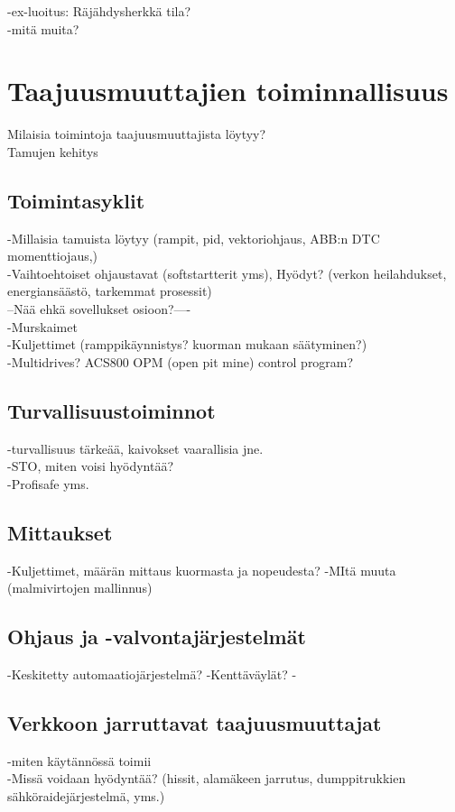\documentclass[finnish,12pt,a4paper,pdftex,elec,utf8]{aaltothesis}
\begin{document}
-ex-luoitus: Räjähdysherkkä tila?\\
-mitä muita?




\clearpage
\section{Taajuusmuuttajien toiminnallisuus}
Milaisia toimintoja taajuusmuuttajista löytyy?\\
Tamujen kehitys

\subsection{Toimintasyklit}
-Millaisia tamuista löytyy (rampit, pid, vektoriohjaus, ABB:n DTC momenttiojaus,)\\
-Vaihtoehtoiset ohjaustavat (softstartterit yms), Hyödyt? (verkon heilahdukset, energiansäästö, tarkemmat prosessit)\\


--Nää ehkä sovellukset osioon?----\\
-Murskaimet \cite{Hulthen}\\
-Kuljettimet (ramppikäynnistys? kuorman mukaan säätyminen?)\\
-Multidrives? ACS800 OPM (open pit mine) control program?


\subsection{Turvallisuustoiminnot}
-turvallisuus tärkeää, kaivokset vaarallisia jne.\\
-STO, miten voisi hyödyntää?\\
-Profisafe yms.

\subsection{Mittaukset}
-Kuljettimet, määrän mittaus kuormasta ja nopeudesta?
-MItä muuta (malmivirtojen mallinnus)

\subsection{Ohjaus ja -valvontajärjestelmät}
-Keskitetty automaatiojärjestelmä?
-Kenttäväylät?
-
\subsection{Verkkoon jarruttavat taajuusmuuttajat}
-miten käytännössä toimii\\
-Missä voidaan hyödyntää? (hissit, alamäkeen jarrutus, dumppitrukkien sähköraidejärjestelmä, yms.)
\end{document}
